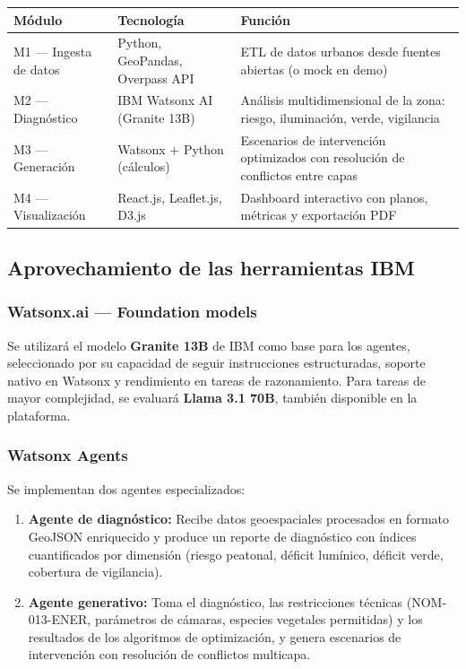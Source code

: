 \documentclass[12pt,a4paper]{article}
\begin{document}
\begin{table}[H]
\centering
\small
\renewcommand{\arraystretch}{1.3}
\begin{tabularx}{\textwidth}{l l X}
\toprule
\rowcolor{azuloscuro}
\color{white}\textbf{Módulo} & \color{white}\textbf{Tecnología} & \color{white}\textbf{Función} \\
\midrule
M1 — Ingesta de datos & Python, GeoPandas, Overpass API & ETL de datos urbanos desde fuentes abiertas (o mock en demo) \\
\rowcolor{fondoazul}
M2 — Diagnóstico & IBM Watsonx AI (Granite 13B) & Análisis multidimensional de la zona: riesgo, iluminación, verde, vigilancia \\
M3 — Generación & Watsonx + Python (cálculos) & Escenarios de intervención optimizados con resolución de conflictos entre capas \\
\rowcolor{fondoazul}
M4 — Visualización & React.js, Leaflet.js, D3.js & Dashboard interactivo con planos, métricas y exportación PDF \\
\bottomrule
\end{tabularx}
\end{table}

\subsection{Aprovechamiento de las herramientas IBM}

\subsubsection{Watsonx.ai — Foundation models}

Se utilizará el modelo \textbf{Granite 13B} de IBM como base para los agentes, seleccionado por su capacidad de seguir instrucciones estructuradas, soporte nativo en Watsonx y rendimiento en tareas de razonamiento. Para tareas de mayor complejidad, se evaluará \textbf{Llama 3.1 70B}, también disponible en la plataforma.

\subsubsection{Watsonx Agents}

Se implementan dos agentes especializados:

\begin{enumerate}[leftmargin=1.5cm, itemsep=4pt]
  \item \textbf{Agente de diagnóstico:} Recibe datos geoespaciales procesados en formato GeoJSON enriquecido y produce un reporte de diagnóstico con índices cuantificados por dimensión (riesgo peatonal, déficit lumínico, déficit verde, cobertura de vigilancia).
  
  \item \textbf{Agente generativo:} Toma el diagnóstico, las restricciones técnicas (NOM-013-ENER, parámetros de cámaras, especies vegetales permitidas) y los resultados de los algoritmos de optimización, y genera escenarios de intervención con resolución de conflictos multicapa.
\end{enumerate}
\end{document}
